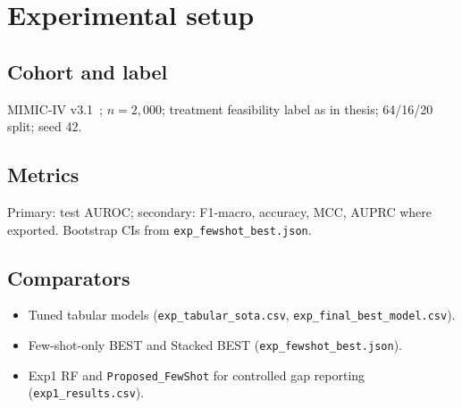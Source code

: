 \section{Experimental setup}
\label{sec:setup}

\subsection{Cohort and label}
MIMIC-IV v3.1~\citep{johnson2023mimic}; $n{=}2{,}000$; treatment feasibility label as in thesis; 64/16/20 split; seed 42.

\subsection{Metrics}
Primary: test AUROC; secondary: F1-macro, accuracy, MCC, AUPRC where exported. Bootstrap CIs from \texttt{exp\_fewshot\_best.json}.

\subsection{Comparators}
\begin{itemize}
  \item Tuned tabular models (\texttt{exp\_tabular\_sota.csv}, \texttt{exp\_final\_best\_model.csv}).
  \item Few-shot-only BEST and Stacked BEST (\texttt{exp\_fewshot\_best.json}).
  \item Exp1 RF and \texttt{Proposed\_FewShot} for controlled gap reporting (\texttt{exp1\_results.csv}).
\end{itemize}
